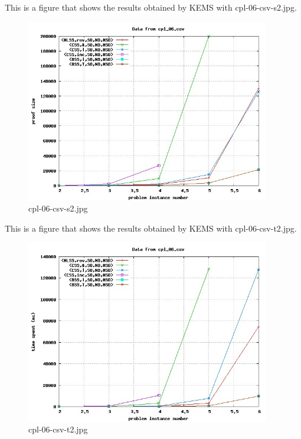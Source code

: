 This is a figure that shows the results obtained by KEMS with cpl-06-csv-s2.jpg.
\begin{figure}[htbp]
\begin{center}
\includegraphics[width=0.95\textwidth]{figuras/cpl-06-csv-s2.jpg}
\end{center}
\caption{cpl-06-csv-s2.jpg}
\end{figure}

This is a figure that shows the results obtained by KEMS with cpl-06-csv-t2.jpg.
\begin{figure}[htbp]
\begin{center}
\includegraphics[width=0.95\textwidth]{figuras/cpl-06-csv-t2.jpg}
\end{center}
\caption{cpl-06-csv-t2.jpg}
\end{figure}

